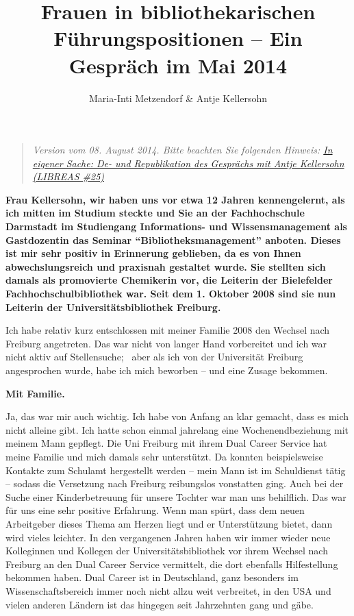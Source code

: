 \documentclass[a4paper,
fontsize=11pt,
oneside,
numbers=noperiodatend,
parskip=half-,
bibliography=totoc,
final
]{scrartcl}
\title{\LARGE{Frauen in bibliothekarischen Führungspositionen – Ein Gespräch im Mai 2014}} %
\author{Maria-Inti Metzendorf \& Antje Kellersohn} %
\date{}
\begin{document}
\maketitle
\thispagestyle{fancyplain} 


\begin{quote}
\emph{Version vom 08. August 2014. Bitte beachten Sie folgenden Hinweis:
\href{https://libreas.wordpress.com/2014/08/09/interview_antje_kellersohn/{]}}{In
eigener Sache: De- und Republikation des Gesprächs mit Antje Kellersohn
(LIBREAS \#25)}}
\end{quote}

\textbf{Frau Kellersohn, wir haben uns vor etwa 12 Jahren kennengelernt,
als ich mitten im Studium steckte und Sie an der Fachhochschule
Darmstadt im Studiengang Informations- und Wissensmanagement als
Gastdozentin das Seminar \enquote{Bibliotheksmanagement} anboten. Dieses
ist mir sehr positiv in Erinnerung geblieben, da es von Ihnen
abwechslungsreich und praxisnah gestaltet wurde. Sie stellten sich
damals als promovierte Chemikerin vor, die Leiterin der Bielefelder
Fachhochschulbibliothek war. Seit dem 1. Oktober 2008 sind sie nun
Leiterin der Universitätsbibliothek Freiburg.}

Ich habe relativ kurz entschlossen mit meiner Familie 2008 den Wechsel
nach Freiburg angetreten. Das war nicht von langer Hand vorbereitet und
ich war nicht aktiv auf Stellensuche;~ aber als ich von der Universität
Freiburg angesprochen wurde, habe ich mich beworben -- und eine Zusage
bekommen.~

\textbf{Mit Familie.}

Ja, das war mir auch wichtig. Ich habe von Anfang an klar gemacht, dass
es mich nicht alleine gibt. Ich hatte schon einmal jahrelang eine
Wochenendbeziehung mit meinem Mann gepflegt. Die Uni Freiburg mit ihrem
Dual Career Service hat meine Familie und mich damals sehr unterstützt.
Da konnten beispielsweise Kontakte zum Schulamt hergestellt werden --
mein Mann ist im Schuldienst tätig -- sodass die Versetzung nach
Freiburg reibungslos vonstatten ging. Auch bei der Suche einer
Kinderbetreuung für unsere Tochter war man uns behilflich. Das war für
uns eine sehr positive Erfahrung. Wenn man spürt, dass dem neuen
Arbeitgeber dieses Thema am Herzen liegt und er Unterstützung bietet,
dann wird vieles leichter. In den vergangenen Jahren haben wir immer
wieder neue Kolleginnen und Kollegen der Universitätsbibliothek vor
ihrem Wechsel nach Freiburg an den Dual Career Service vermittelt, die
dort ebenfalls Hilfestellung bekommen haben. Dual Career ist in
Deutschland, ganz besonders im Wissenschaftsbereich immer noch nicht
allzu weit verbreitet, in den USA und vielen anderen Ländern ist das
hingegen seit Jahrzehnten gang und gäbe.~
\end{document}
